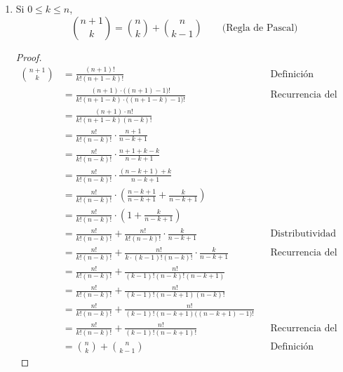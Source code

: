 \begin{enumerate}[label=\alph*)]
  \item Si $0\leq k \leq n$, \[\binom{n+1}{k} = \binom{n}{k} + \binom{n}{k-1} \qquad \text{(Regla de Pascal)}\]
  \begin{proof}\leavevmode
    \begin{align*}
    \binom{n+1}{k} &= \frac{(n+1)!}{k!(n+1-k)!} && \text{Definición}\\
    &= \frac{(n+1)\cdot \big((n+1)-1\big)!}{k!(n+1-k)\cdot \big((n+1-k)-1\big)!} && \text{Recurrencia del factorial}\\
    &= \frac{(n+1)\cdot n!}{k!(n+1-k)(n-k)!}\\
    &= \frac{n!}{k! (n-k)!} \cdot \frac{n+1}{n-k+1} \\
    &= \frac{n!}{k! (n-k)!} \cdot \frac{n+1+k-k}{n-k+1} \\
    &= \frac{n!}{k! (n-k)!} \cdot \frac{(n-k+1)+k}{n-k+1} \\
    &= \frac{n!}{k!(n-k)!}\cdot \left(\frac{n-k+1}{n-k+1}+\frac{k}{n-k+1}\right) \\
    &= \frac{n!}{k!(n-k)!} \cdot \left(1+\frac{k}{n-k+1}\right) \\
    &= \frac{n!}{k!(n-k)!} + \frac{n!}{k!(n-k)!}\cdot \frac{k}{n-k+1} && \text{Distributividad}\\
    &= \frac{n!}{k!(n-k)!} + \frac{n!}{k\cdot (k-1)!(n-k)!}\cdot \frac{k}{n-k+1} && \text{Recurrencia del factorial}\\
    &= \frac{n!}{k!(n-k)!} + \frac{n!}{(k-1)!(n-k)!(n-k+1)}\\
    &= \frac{n!}{k!(n-k)!} + \frac{n!}{(k-1)!(n-k+1)(n-k)!}\\
    &= \frac{n!}{k!(n-k)!} + \frac{n!}{(k-1)!(n-k+1)\big((n-k+1)-1\big)!}\\
    &= \frac{n!}{k!(n-k)!} + \frac{n!}{(k-1)!(n-k+1)!} && \text{Recurrencia del factorial}\\
    &= \binom{n}{k} + \binom{n}{k-1} && \text{Definición}
    \end{align*}
  \end{proof}
  
\clearpage
\pagebreak
  

\end{enumerate}
